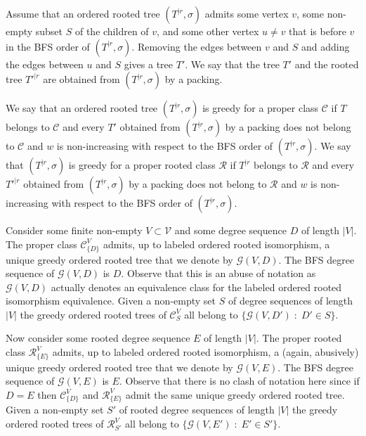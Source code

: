 \documentclass[11 pt]{modarticle}
\newcommand{\vset}{\mathcal{V}}
\newcommand{\wmap}{w}
\newcommand{\size}[1]{|#1|}
\newcommand{\rtree}[2]{{#1}^{\lvert #2}}
\newcommand{\ortree}[3]{(\rtree{#1}{#2},{#3})}
\newcommand{\tclass}{\mathcal{C}}
\newcommand{\rtclass}{\mathcal{R}}
\newcommand{\greedy}[2]{\mathcal{G}(#1,#2)}
\newcommand{\pclass}[2]{\tclass^{#1}_{#2}}
\newcommand{\rpclass}[2]{\rtclass^{#1}_{#2}}
\begin{document}
\begin{defi}
Assume that an ordered rooted tree $\ortree{T}{r}{\sigma}$ admits some vertex $v$, some non-empty subset $S$ of the children of $v$, and some other vertex $u \neq v$ that is before $v$ in the BFS order of $\ortree{T}{r}{\sigma}$. Removing the edges between $v$ and $S$ and adding the edges between $u$ and $S$ gives a tree $T'$. We say that the tree $T'$ and the rooted tree $\rtree{T'}{r}$ are obtained from $\ortree{T}{r}{\sigma}$ by a packing.
\end{defi}

\begin{defi}
We say that an ordered rooted tree $\ortree{T}{r}{\sigma}$ is greedy for a proper class $\tclass$ if $T$ belongs to $\tclass$ and every $T'$ obtained from $\ortree{T}{r}{\sigma}$ by a packing does not belong to $\tclass$ and $\wmap$ is non-increasing with respect to the BFS order of $\ortree{T}{r}{\sigma}$. We say that $\ortree{T}{r}{\sigma}$ is greedy for a proper rooted class $\rtclass$ if $\rtree{T}{r}$ belongs to $\rtclass$ and every $\rtree{T'}{r}$ obtained from $\ortree{T}{r}{\sigma}$ by a packing does not belong to $\rtclass$ and $\wmap$ is non-increasing with respect to the BFS order of $\ortree{T}{r}{\sigma}$.
\end{defi}

Consider some finite non-empty $V \subset \vset$ and some degree sequence $D$ of length $\size{V}$. The proper class $\pclass{V}{\{D\}}$ admits, up to labeled ordered rooted isomorphism, a unique greedy ordered rooted tree that we denote by $\greedy{V}{D}$. The BFS degree sequence of $\greedy{V}{D}$ is $D$. Observe that this is an abuse of notation as $\greedy{V}{D}$ actually denotes an equivalence class for the labeled ordered rooted isomorphism equivalence. Given a non-empty set $S$ of degree sequences of length $\size{V}$ the greedy ordered rooted trees of $\pclass{V}{S}$ all belong to $\{\greedy{V}{D'} \;:\; D' \in S\}$.

Now consider some rooted degree sequence $E$ of length $\size{V}$. The proper rooted class $\rpclass{V}{\{E\}}$ admits, up to labeled ordered rooted isomorphism, a (again, abusively) unique greedy ordered rooted tree that we denote by $\greedy{V}{E}$. The BFS degree sequence of $\greedy{V}{E}$ is $E$. Observe that there is no clash of notation here since if $D = E$ then $\pclass{V}{\{D\}}$ and $\rpclass{V}{\{E\}}$ admit the same unique greedy ordered rooted tree. Given a non-empty set $S'$ of rooted degree sequences of length $\size{V}$ the greedy ordered rooted trees of $\rpclass{V}{S'}$ all belong to $\{\greedy{V}{E'} \;:\; E' \in S'\}$. 
\end{document}
